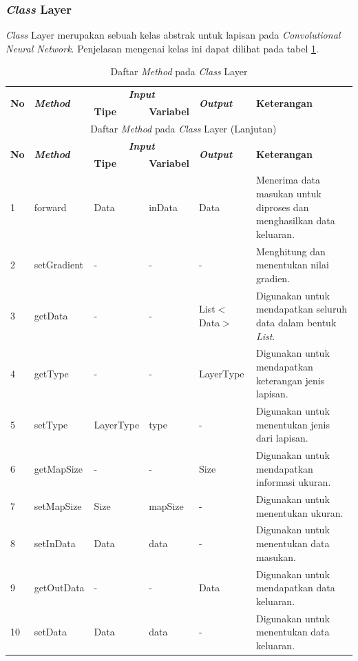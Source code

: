 \subsubsection{\textit{Class} Layer}
\noindent \textit{Class} Layer merupakan sebuah kelas abstrak untuk lapisan pada \textit{Convolutional Neural Network}. Penjelasan mengenai kelas ini dapat dilihat pada tabel \ref{tbl:classLayer}.
\begingroup
\setlength{\LTleft}{-20cm plus -1fill}
\setlength{\LTright}{\LTleft}
\begin{small}
\begin{longtable}{|p{0.4cm}|p{2cm}|p{1.8cm}|p{1.8cm}|p{1.7cm}|p{3.55cm}|}
	\caption{Daftar \textit{Method} pada \textit{Class} Layer \label{tbl:classLayer}}\\
	\hline
	\multirow{2}{*}{\textbf{No}} & \multirow{2}{*}{\textit{\textbf{Method}}} & \multicolumn{2}{c|}{\textit{\textbf{Input}}} & \multirow{2}{*}{\textit{\textbf{Output}}} & 
	\multirow{2}{*}{\textbf{Keterangan}}\\
	\cline{3-4}
	& & \textbf{Tipe} & \textbf{Variabel} & & \\
	\endfirsthead
	\multicolumn{6}{c}{\textbf{\tablename~\thetable} Daftar \textit{Method} pada \textit{Class} Layer (Lanjutan)} \\
	\hline
	\multirow{2}{*}{\textbf{No}} & \multirow{2}{*}{\textit{\textbf{Method}}} & \multicolumn{2}{c|}{\textit{\textbf{Input}}} & \multirow{2}{*}{\textit{\textbf{Output}}} & 
	\multirow{2}{*}{\textbf{Keterangan}}\\
	\cline{3-4}
	& & \textbf{Tipe} & \textbf{Variabel} & & \\
	\endhead
	\hline
	1 & forward & Data & inData & Data & Menerima data masukan untuk diproses dan menghasilkan data keluaran.\\
	\hline
	2 & setGradient & - & - & - & Menghitung dan menentukan nilai gradien.\\
	\hline
	3 & getData & - & - & List$<$Data$>$ & Digunakan untuk mendapatkan seluruh data dalam bentuk \textit{List}.\\
	\hline
	4 & getType & - & - & LayerType & Digunakan untuk mendapatkan keterangan jenis lapisan.\\
	\hline
	5 & setType & LayerType & type & - & Digunakan untuk menentukan jenis dari lapisan.\\
	\hline
	6 & getMapSize & - & - & Size & Digunakan untuk mendapatkan informasi ukuran.\\
	\hline
	7 & setMapSize & Size & mapSize & - & Digunakan untuk menentukan ukuran.\\
	\hline
	8 & setInData & Data & data & - & Digunakan untuk menentukan data masukan.\\
	\hline
	9 & getOutData & - & - & Data & Digunakan untuk mendapatkan data keluaran.\\
	\hline
	10 & setData & Data & data & - & Digunakan untuk menentukan data keluaran.\\
	\hline
\end{longtable}
\end{small}
\endgroup

